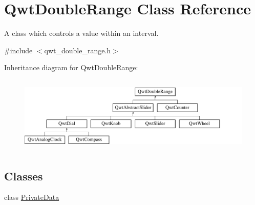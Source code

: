\hypertarget{class_qwt_double_range}{\section{Qwt\-Double\-Range Class Reference}
\label{class_qwt_double_range}
}


A class which controls a value within an interval.  




{\ttfamily \#include $<$qwt\-\_\-double\-\_\-range.\-h$>$}

Inheritance diagram for Qwt\-Double\-Range\-:\begin{figure}[H]
\begin{center}
\leavevmode
\includegraphics[height=3.672131cm]{class_qwt_double_range}
\end{center}
\end{figure}
\subsection*{Classes}
\begin{DoxyCompactItemize}
\item 
class \hyperlink{class_qwt_double_range_1_1_private_data}{Private\-Data}
\end{DoxyCompactItemize}
